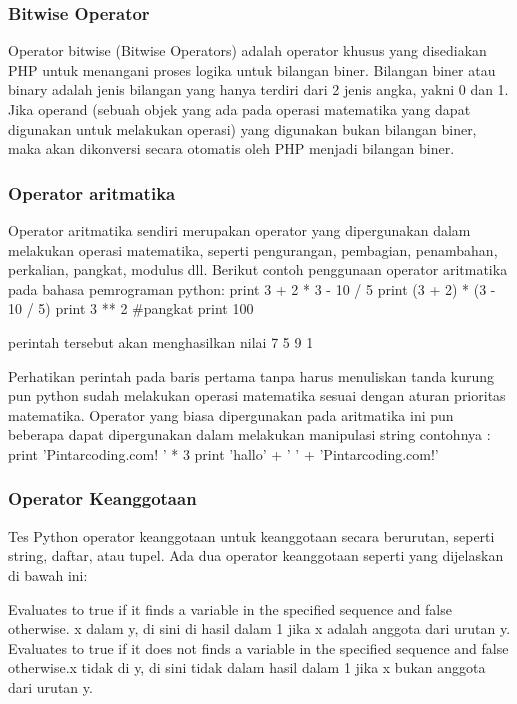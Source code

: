 \subsubsection{Bitwise Operator}
Operator bitwise (Bitwise Operators) adalah operator khusus yang disediakan PHP untuk menangani proses logika untuk bilangan biner. Bilangan biner atau binary adalah jenis bilangan yang hanya terdiri dari 2 jenis angka, yakni 0 dan 1. Jika operand (sebuah objek yang ada pada operasi matematika yang dapat digunakan untuk melakukan operasi) yang digunakan bukan bilangan biner, maka akan dikonversi secara otomatis oleh PHP menjadi bilangan biner.

\subsubsection{Operator aritmatika}
Operator aritmatika sendiri merupakan operator yang dipergunakan dalam melakukan operasi matematika, seperti pengurangan, pembagian, penambahan, perkalian, pangkat, modulus dll. Berikut contoh penggunaan operator aritmatika pada bahasa pemrograman python:
print 3 + 2 * 3 - 10 / 5 
print (3 + 2) * (3 - 10 / 5)
print 3 ** 2 #pangkat
print 100 %

perintah tersebut akan menghasilkan nilai
7
5
9
1

Perhatikan perintah pada baris pertama tanpa harus menuliskan tanda kurung pun python sudah melakukan operasi matematika sesuai dengan aturan prioritas matematika. Operator yang biasa dipergunakan pada aritmatika ini pun beberapa dapat dipergunakan dalam melakukan manipulasi string contohnya :
print 'Pintarcoding.com! ' * 3
print 'hallo' + ' ' + 'Pintarcoding.com!'

\subsubsection{Operator Keanggotaan}
Tes Python operator keanggotaan untuk keanggotaan secara berurutan, seperti string, daftar, atau tupel. Ada dua operator keanggotaan seperti yang dijelaskan di bawah ini:

Evaluates to true if it finds a variable in the specified sequence and false otherwise.	x dalam y, di sini di hasil dalam 1 jika x adalah anggota dari urutan y.
Evaluates to true if it does not finds a variable in the specified sequence and false otherwise.x tidak di y, di sini tidak dalam hasil dalam 1 jika x bukan anggota dari urutan y.

